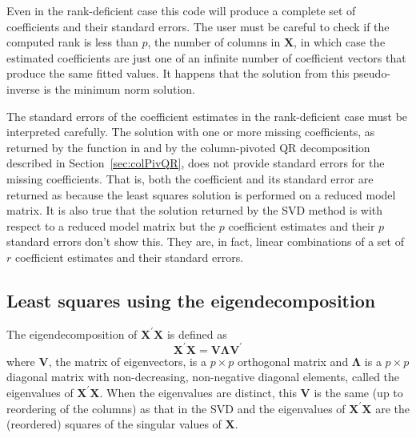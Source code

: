 \documentclass[shortnames,article]{jss}
\begin{document}
Even in the rank-deficient case this code will produce a complete set
of coefficients and their standard errors.  The user must be careful
to check if the computed rank is less than $p$, the number of columns
in $\bm X$, in which case the estimated coefficients are just one of
an infinite number of coefficient vectors that produce the same fitted
values.  It happens that the solution from this pseudo-inverse is the
minimum norm solution.

The standard errors of the coefficient estimates in the rank-deficient
case must be interpreted carefully.  The solution with one or more missing
coefficients, as returned by the  function in
 and by the column-pivoted QR decomposition described in
Section~\ref{sec:colPivQR}, does not provide standard errors for the
missing coefficients.  That is, both the coefficient and its standard
error are returned as  because the least squares solution is
performed on a reduced model matrix.  It is also true that the
solution returned by the SVD method is with respect to a reduced model
matrix but the $p$ coefficient estimates and their $p$ standard errors
don't show this.  They are, in fact, linear combinations of a set of
$r$ coefficient estimates and their standard errors.

\subsection{Least squares using the eigendecomposition}
\label{sec:eigendecomp}

The eigendecomposition of $\bm X^\prime\bm X$ is defined as
\begin{displaymath}
  \bm X^\prime\bm X=\bm V\bm\Lambda\bm V^\prime
\end{displaymath}
where $\bm V$, the matrix of eigenvectors, is a $p\times p$ orthogonal
matrix and $\bm\Lambda$ is a $p\times p$ diagonal matrix with
non-decreasing, non-negative diagonal elements, called the eigenvalues
of $\bm X^\prime\bm X$.  When the eigenvalues are distinct, this $\bm
V$ is the same (up to reordering of the columns) as that in the SVD
and the eigenvalues of $\bm X^\prime\bm X$ are the (reordered) squares
of the singular values of $\bm X$.
\end{document}
